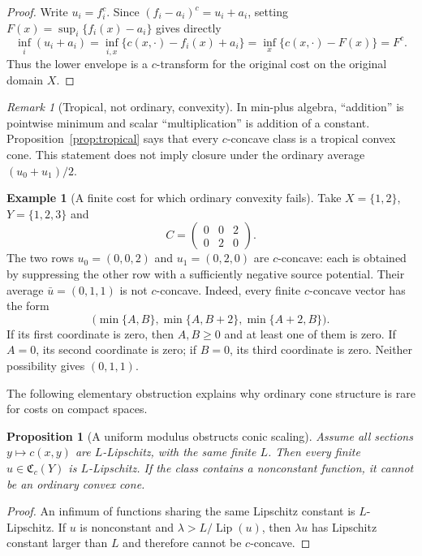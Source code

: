 \documentclass[11pt,a4paper]{article}
\newtheorem{proposition}[theorem]{Proposition}
\theoremstyle{definition}
\newtheorem{example}[theorem]{Example}
\theoremstyle{remark}
\newtheorem{remark}[theorem]{Remark}
\newcommand{\Cfrak}{\mathfrak C}
\newcommand{\Lip}{\operatorname{Lip}}
\begin{document}
\begin{proof}
Write $u_i=f_i^c$. Since $(f_i-a_i)^c=u_i+a_i$, setting
$F(x)=\sup_i\{f_i(x)-a_i\}$ gives directly
\[
  \inf_i(u_i+a_i)
  =\inf_{i,x}\{c(x,\cdot)-f_i(x)+a_i\}
  =\inf_x\{c(x,\cdot)-F(x)\}=F^c.
\]
Thus the lower envelope is a $c$-transform for the original cost on the
original domain $X$.
\end{proof}

\begin{remark}[Tropical, not ordinary, convexity]
In min-plus algebra, ``addition'' is pointwise minimum and scalar
``multiplication'' is addition of a constant. Proposition~\ref{prop:tropical}
says that every $c$-concave class is a tropical convex cone. This statement
does not imply closure under the ordinary average $(u_0+u_1)/2$.
\end{remark}

\begin{example}[A finite cost for which ordinary convexity fails]\label{ex:finite-nonconvex}
Take $X=\{1,2\}$, $Y=\{1,2,3\}$ and
\[
  C=\begin{pmatrix}0&0&2\\0&2&0\end{pmatrix}.
\]
The two rows
$u_0=(0,0,2)$ and $u_1=(0,2,0)$ are $c$-concave: each is obtained by
suppressing the other row with a sufficiently negative source potential. Their
average $\bar u=(0,1,1)$ is not $c$-concave. Indeed, every finite
$c$-concave vector has the form
\[
  \bigl(\min\{A,B\},\min\{A,B+2\},\min\{A+2,B\}\bigr).
\]
If its first coordinate is zero, then $A,B\geq0$ and at least one of them is
zero. If $A=0$, its second coordinate is zero; if $B=0$, its third coordinate
is zero. Neither possibility gives $(0,1,1)$.
\end{example}

The following elementary obstruction explains why ordinary cone structure is
rare for costs on compact spaces.

\begin{proposition}[A uniform modulus obstructs conic scaling]\label{prop:cone-obstruction}
Assume all sections $y\mapsto c(x,y)$ are $L$-Lipschitz, with the same finite
$L$. Then every finite $u\in\Cfrak_c(Y)$ is $L$-Lipschitz. If the class
contains a nonconstant function, it cannot be an ordinary convex cone.
\end{proposition}

\begin{proof}
An infimum of functions sharing the same Lipschitz constant is $L$-Lipschitz.
If $u$ is nonconstant and $\lambda>L/\Lip(u)$, then $\lambda u$ has Lipschitz
constant larger than $L$ and therefore cannot be $c$-concave.
\end{proof}
\end{document}
